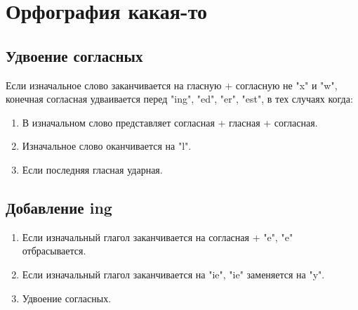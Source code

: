 \documentclass[oneside]{book}
\begin{document}
	\chapter{Орфография какая-то}
	\section{Удвоение согласных}
	Если изначальное слово заканчивается на гласную + согласную не "x" и "w", конечная
	согласная удваивается перед "ing"{}, "ed"{}, "er"{}, "est"{},
	в тех случаях когда:
	\begin{enumerate}
		\item В изначальном слово представляет согласная + гласная + согласная.
		\item Изначальное слово оканчивается на "l".
		\item Если последняя гласная ударная.
	\end{enumerate}

	\section{Добавление ing}
	\begin{enumerate}
		\item Если изначальный глагол заканчивается на согласная + "e"{}, "e" отбрасывается.
		\item Если изначальный глагол заканчивается на "ie"{}, "ie" заменяется на "y".
		\item Удвоение согласных.
	\end{enumerate}
\end{document}

